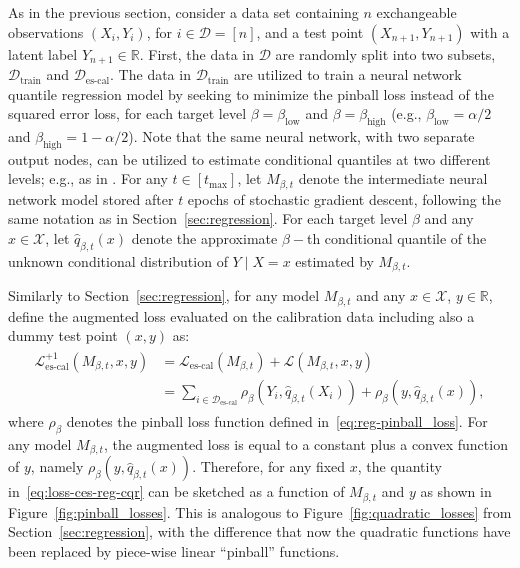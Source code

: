 As in the previous section, consider a data set containing $n$ exchangeable observations $(X_i,Y_i)$, for $i \in \mathcal{D} = [n]$, and a test point $(X_{n+1}, Y_{n+1})$ with a latent label $Y_{n+1} \in \mathbb{R}$. 
First, the data in $\mathcal{D}$ are randomly split into two subsets, $\mathcal{D}_{\text{train}}$ and $\mathcal{D}_{\text{es-cal}}$. The data in $\mathcal{D}_{\text{train}}$ are utilized to train a neural network quantile regression model \cite{taylor2000quantile} by seeking to minimize the pinball loss instead of the squared error loss, for each target level $\beta=\beta_{\text{low}}$ and $\beta=\beta_{\text{high}}$ (e.g., $\beta_{\text{low}} = \alpha/2$ and $\beta_{\text{high}}=1-\alpha/2$). Note that the same neural network, with two separate output nodes, can be utilized to estimate conditional quantiles at two different levels; e.g., as in \citet{romano2019conformalized}.
For any $t \in [t_{\max}]$, let $M_{\beta, t}$ denote the intermediate neural network model stored after $t$ epochs of stochastic gradient descent, following the same notation as in Section~\ref{sec:regression}.
For each target level $\beta$ and any $x \in \mathcal{X}$, let $\hat{q}_{\beta, t}(x)$ denote the approximate $\beta-$th conditional quantile of the unknown conditional distribution of $Y \mid X=x$ estimated by $M_{\beta, t}$.


Similarly to Section~\ref{sec:regression}, for any model $M_{\beta, t}$ and any $x \in \mathcal{X}$, $y \in \mathbb{R}$, define the augmented loss evaluated on the calibration data including also a dummy test point $(x,y)$ as:
\begin{align}\label{eq:loss-ces-reg-cqr}
  \begin{split}
    \mathcal{L}_{\text{es-cal}}^{+1}(M_{\beta, t},x,y)
    & = \mathcal{L}_{\text{es-cal}}(M_{\beta, t}) + \mathcal{L}(M_{\beta, t}, x, y) \\
    & = \sum_{i \in \mathcal{D}_{\text{es-cal}}} \rho_\beta(Y_i, \hat{q}_{\beta, t}(X_i)) + \rho_\beta(y, \hat{q}_{\beta, t}(x)),
  \end{split}
\end{align}
where $\rho_\beta$ denotes the pinball loss function defined in~\eqref{eq:reg-pinball_loss}.
For any model $M_{\beta, t}$, the augmented loss is equal to a constant plus a convex function of $y$, namely $\rho_\beta(y, \hat{q}_{\beta, t}(x))$.
Therefore, for any fixed $x$, the quantity in~\eqref{eq:loss-ces-reg-cqr} can be sketched as a function of $M_{\beta, t}$ and $y$ as shown in Figure~\ref{fig:pinball_losses}. This is analogous to Figure~\ref{fig:quadratic_losses} from Section~\ref{sec:regression}, with the difference that now the quadratic functions have been replaced by piece-wise linear ``pinball'' functions.


